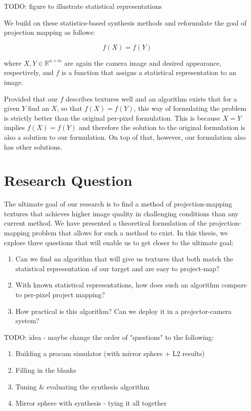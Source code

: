 {\color{red} TODO: figure to illustrate statistical representations}

We build on these statistics-based synthesis methods and reformulate the goal of projection mapping as follows:

\[
    f(X) = f(Y)
\]

where \(X,Y \in \mathbb{R}^{n \times m}\) are again the camera image and desired appearance, respectively, and \(f\) is a function that assigns a statistical representation to an image.

Provided that our \(f\) describes textures well and an algorithm exists that for a given \(Y\) find an \(X\), so that \(f(X) = f(Y)\), this way of formulating the problem is strictly better than the original per-pixel formulation. This is because \(X = Y\) implies \(f(X) = f(Y)\) and therefore the solution to the original formulation is also a solution to our formulation. On top of that, however, our formulation also has other solutions.

\section{Research Question}
\label{section:intro-research_question}

The ultimate goal of our research is to find a method of projection-mapping textures that achieves higher image quality in challenging conditions than any current method. We have presented a theoretical formulation of the projection-mapping problem that allows for such a method to exist. In this thesis, we explore three questions that will enable us to get closer to the ultimate goal:

\begin{enumerate}
    \item Can we find an algorithm that will give us textures that both match the statistical representation of our target and are easy to project-map?
    \item With known statistical representations, how does such an algorithm compare to per-pixel project mapping?
    \item How practical is this algorithm? Can we deploy it in a projector-camera system?
\end{enumerate}

{\color{red} TODO: idea - maybe change the order of "questions" to the following:
    \begin{enumerate}
        \item Building a procam simulator (with mirror sphere + L2 results)
        \item Filling in the blanks
        \item Tuning \& evaluating the synthesis algorithm
        \item Mirror sphere with synthesis - tying it all together
    \end{enumerate}
}

